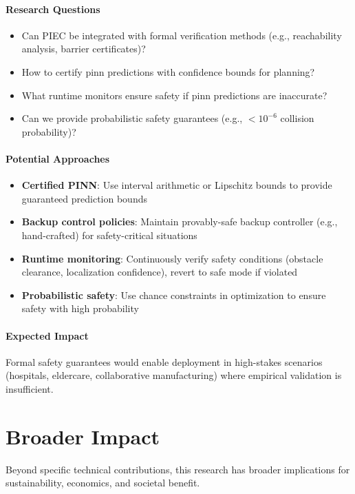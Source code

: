 \paragraph{Research Questions}
\begin{itemize}
    \item Can PIEC be integrated with formal verification methods (e.g., reachability analysis, barrier certificates)?
    \item How to certify \acrshort{pinn} predictions with confidence bounds for planning?
    \item What runtime monitors ensure safety if \acrshort{pinn} predictions are inaccurate?
    \item Can we provide probabilistic safety guarantees (e.g., $< 10^{-6}$ collision probability)?
\end{itemize}

\paragraph{Potential Approaches}
\begin{itemize}
    \item \textbf{Certified PINN}: Use interval arithmetic or Lipschitz bounds to provide guaranteed prediction bounds
    \item \textbf{Backup control policies}: Maintain provably-safe backup controller (e.g., hand-crafted) for safety-critical situations
    \item \textbf{Runtime monitoring}: Continuously verify safety conditions (obstacle clearance, localization confidence), revert to safe mode if violated
    \item \textbf{Probabilistic safety}: Use chance constraints in optimization to ensure safety with high probability
\end{itemize}

\paragraph{Expected Impact}
Formal safety guarantees would enable deployment in high-stakes scenarios (hospitals, eldercare, collaborative manufacturing) where empirical validation is insufficient.

\section{Broader Impact}
\label{sec:broader_impact}

Beyond specific technical contributions, this research has broader implications for sustainability, economics, and societal benefit.

